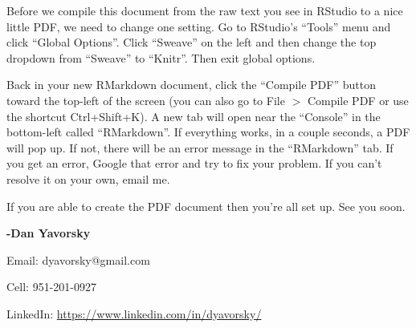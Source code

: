 \documentclass{article}\usepackage[]{graphicx}\usepackage[]{color}
\begin{document}
Before we compile this document from the raw text you see in RStudio to a nice little PDF, we need to change one setting. Go to RStudio's ``Tools'' menu and click ``Global Options''. Click ``Sweave'' on the left and then change the top dropdown from ``Sweave'' to ``Knitr''. Then exit global options.

Back in your new RMarkdown document, click the ``Compile PDF'' button toward the top-left of the screen (you can also go to File $>$ Compile PDF or use the shortcut Ctrl+Shift+K). A new tab will open near the ``Console'' in the bottom-left called ``RMarkdown''. If everything works, in a couple seconds, a PDF will pop up. If not, there will be an error message in the ``RMarkdown'' tab. If you get an error, Google that error and try to fix your problem. If you can't resolve it on your own, email me.

If you are able to create the PDF document then you're all set up. See you soon.

\bigskip

\textbf{-Dan Yavorsky}

Email: dyavorsky@gmail.com 

Cell: 951-201-0927

LinkedIn: \url{https://www.linkedin.com/in/dyavorsky/}
\end{document}
